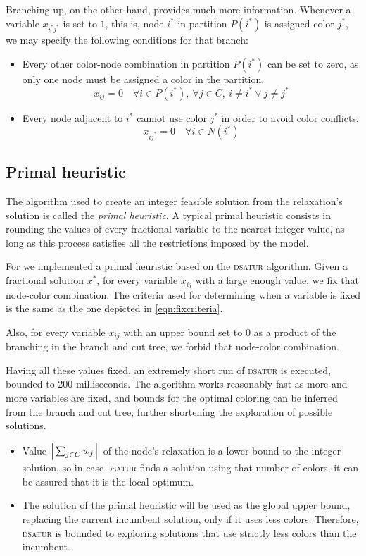 Branching up, on the other hand, provides much more information. Whenever a variable $x_{i^*j^*}$ is set to $1$, this is, node $i^*$ in partition $P(i^*)$ is assigned color $j^*$, we may specify the following conditions for that branch:

\begin{itemize}
\item Every other color-node combination in partition $P(i^*)$ can be set to zero, as only one node must be assigned a color in the partition.
\[
x_{ij} = 0 \quad \forall i \in P(i^*),\ \forall j \in C,\ i \neq i^* \vee j \neq j^*
\]

\item Every node adjacent to $i^*$ cannot use color $j^*$ in order to avoid color conflicts.
\[
x_{ij^*} = 0 \quad \forall i \in N(i^*)
\]
\end{itemize}

\subsection{Primal heuristic}
\label{subsec:alg:primal}

The algorithm used to create an integer feasible solution from the relaxation's solution is called the \textit{primal heuristic}. A typical primal heuristic consists in rounding the values of every fractional variable to the nearest integer value, as long as this process satisfies all the restrictions imposed by the model.

For \PCP{} we implemented a primal heuristic based on the \textsc{dsatur} algorithm. Given a fractional solution $x^*$, for every variable $x_{ij}$ with a large enough value, we fix that node-color combination. The criteria used for determining when a variable is fixed is the same as the one depicted in \ref{eqn:fixcriteria}.

Also, for every variable $x_{ij}$ with an upper bound set to $0$ as a product of the branching in the branch and cut tree, we forbid that node-color combination.

Having all these values fixed, an extremely short run of \textsc{dsatur} is executed, bounded to 200 milliseconds. The algorithm works reasonably fast as more and more variables are fixed, and bounds for the optimal coloring can be inferred from the branch and cut tree, further shortening the exploration of possible solutions. 
\begin{itemize}
\item{Value $\left\lceil \sum_{j \in C} w_j \right\rceil$ of the node's relaxation is a lower bound to the integer solution, so in case \textsc{dsatur} finds a solution using that number of colors, it can be assured that it is the local optimum.}
\item{The solution of the primal heuristic will be used as the global upper bound, replacing the current incumbent solution, only if it uses less colors. Therefore, \textsc{dsatur} is bounded to exploring solutions that use strictly less colors than the incumbent.}
\end{itemize}


